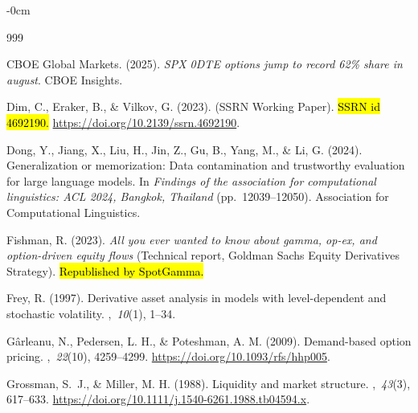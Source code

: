 \documentclass[jrfm,article,accept,moreauthors,pdftex]{Definitions/mdpi}
\begin{document}
\begin{adjustwidth}{-\extralength}{0cm}
\begin{thebibliography}{999}

{CBOE Global Markets}. (2025).
\newblock \textit{{SPX} 0{DTE} options jump to record 62\% share in august}.
\newblock CBOE Insights.

Dim, C., Eraker, B., \& Vilkov, G. (2023).
 (SSRN Working Paper).
\newblock \hl{SSRN id 4692190.} %
  \url{https://doi.org/10.2139/ssrn.4692190}.

Dong, Y., Jiang, X., Liu, H., Jin, Z., Gu, B., Yang, M., \& Li, G.
  (2024).
\newblock Generalization or memorization: Data contamination and trustworthy
  evaluation for large language models.
\newblock In {\em Findings of the association for computational linguistics:
  ACL 2024, Bangkok, Thailand} (pp.\  12039--12050). Association for
  Computational Linguistics.

Fishman, R. (2023).
\newblock \textit{All you ever wanted to know about gamma, op-ex, and option-driven
  equity flows} (Technical report, Goldman Sachs Equity Derivatives Strategy).
\newblock \hl{Republished by SpotGamma.} %


Frey, R. (1997).
\newblock Derivative asset analysis in models with level-dependent and
  stochastic volatility.
,~{\em 10\/}(1), 1--34.

G\^{a}rleanu, N., Pedersen, L. H., \& Poteshman, A. M. (2009).
\newblock Demand-based option pricing.
,~{\em 22\/}(10), 4259--4299.
\newblock
  \url{https://doi.org/10.1093/rfs/hhp005}.

Grossman, S.~J., \& Miller, M. H. (1988).
\newblock Liquidity and market structure.
,~{\em 43\/}(3), 617--633.
\newblock
  \url{https://doi.org/10.1111/j.1540-6261.1988.tb04594.x}.


\end{thebibliography}
\end{adjustwidth}
\end{document}
